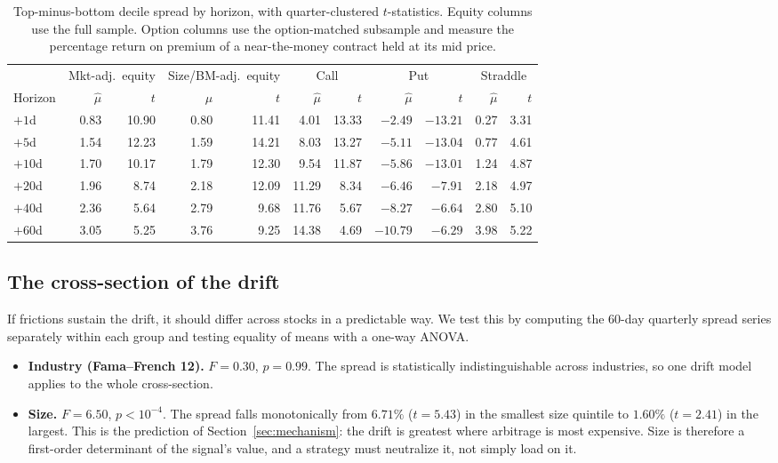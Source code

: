 \documentclass[11pt]{article}
\theoremstyle{definition}
\newcommand{\1}{\mathbf{1}}
\begin{document}
\begin{table}[t]\centering\small
\caption{Top-minus-bottom decile spread by horizon, with quarter-clustered $t$-statistics.
Equity columns use the full sample. Option columns use the option-matched subsample and
measure the percentage return on premium of a near-the-money contract held at its mid price.}\label{tab:spreads}
\begin{tabular}{l rr rr rr rr rr}
\toprule
 & \multicolumn{2}{c}{Mkt-adj.\ equity} & \multicolumn{2}{c}{Size/BM-adj.\ equity} & \multicolumn{2}{c}{Call} & \multicolumn{2}{c}{Put} & \multicolumn{2}{c}{Straddle}\\
\cmidrule(lr){2-3}\cmidrule(lr){4-5}\cmidrule(lr){6-7}\cmidrule(lr){8-9}\cmidrule(lr){10-11}
Horizon & $\hat\mu$ & $t$ & $\hat\mu$ & $t$ & $\hat\mu$ & $t$ & $\hat\mu$ & $t$ & $\hat\mu$ & $t$\\
\midrule
$+1$d  & 0.83 & 10.90 & 0.80 & 11.41 & 4.01 & 13.33 & $-2.49$ & $-13.21$ & 0.27 & 3.31\\
$+5$d  & 1.54 & 12.23 & 1.59 & 14.21 & 8.03 & 13.27 & $-5.11$ & $-13.04$ & 0.77 & 4.61\\
$+10$d & 1.70 & 10.17 & 1.79 & 12.30 & 9.54 & 11.87 & $-5.86$ & $-13.01$ & 1.24 & 4.87\\
$+20$d & 1.96 & 8.74  & 2.18 & 12.09 & 11.29 & 8.34 & $-6.46$ & $-7.91$ & 2.18 & 4.97\\
$+40$d & 2.36 & 5.64  & 2.79 & 9.68  & 11.76 & 5.67 & $-8.27$ & $-6.64$ & 2.80 & 5.10\\
$+60$d & 3.05 & 5.25  & 3.76 & 9.25  & 14.38 & 4.69 & $-10.79$ & $-6.29$ & 3.98 & 5.22\\
\bottomrule
\end{tabular}
\end{table}

\subsection{The cross-section of the drift}

If frictions sustain the drift, it should differ across stocks in a predictable way. We test
this by computing the 60-day quarterly spread series separately within each group and testing
equality of means with a one-way ANOVA.
\begin{itemize}
  \item \textbf{Industry (Fama--French 12).} $F=0.30$, $p=0.99$. The spread is statistically
        indistinguishable across industries, so one drift model applies to the whole cross-section.
  \item \textbf{Size.} $F=6.50$, $p<10^{-4}$. The spread falls monotonically from $6.71\%$
        ($t=5.43$) in the smallest size quintile to $1.60\%$ ($t=2.41$) in the largest. This is the
        prediction of Section~\ref{sec:mechanism}: the drift is greatest where arbitrage is most
        expensive. Size is therefore a first-order determinant of the signal's value, and a
        strategy must neutralize it, not simply load on it.
\end{itemize}
\end{document}
